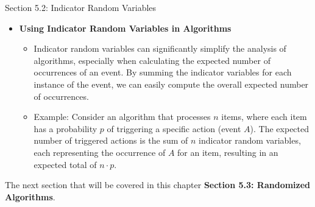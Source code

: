 \begin{notes}{Section 5.2: Indicator Random Variables}
\begin{itemize}
        \item \textbf{Using Indicator Random Variables in Algorithms}
        \begin{itemize}
            \item Indicator random variables can significantly simplify the analysis of algorithms, especially when calculating the expected number of occurrences of an event. By summing the indicator 
            variables for each instance of the event, we can easily compute the overall expected number of occurrences.
            \item Example: Consider an algorithm that processes $n$ items, where each item has a probability $p$ of triggering a specific action (event $A$). The expected number of triggered 
            actions is the sum of $n$ indicator random variables, each representing the occurrence of $A$ for an item, resulting in an expected total of $n \cdot p$.
        \end{itemize}
    \end{itemize}    
\end{notes}

The next section that will be covered in this chapter \textbf{Section 5.3: Randomized Algorithms}.

